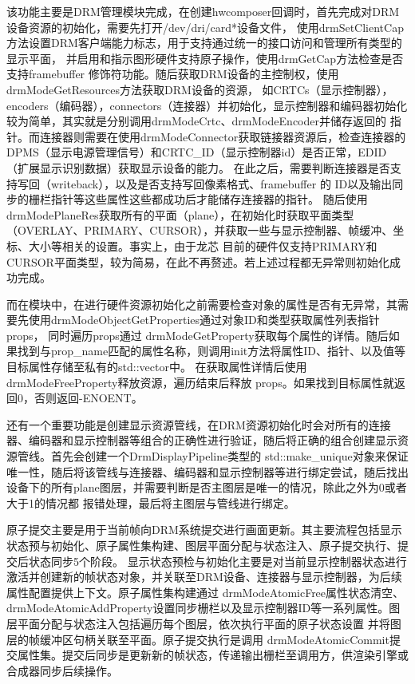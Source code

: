 该功能主要是DRM管理模块完成，在创建hwcomposer回调时，首先完成对DRM设备资源的初始化，需要先打开/dev/dri/card*设备文件，
使用drmSetClientCap方法设置DRM客户端能力标志，用于支持通过统一的接口访问和管理所有类型的显示平面，
并启用和指示图形硬件支持原子操作，使用drmGetCap方法检查是否支持framebuffer 修饰符功能。随后获取DRM设备的主控制权，使用drmModeGetResources方法获取DRM设备的资源，
如CRTCs（显示控制器），encoders（编码器），connectors（连接器）并初始化，显示控制器和编码器初始化较为简单，其实就是分别调用drmModeCrtc、drmModeEncoder并储存返回的
指针。而连接器则需要在使用drmModeConnector获取链接器资源后，检查连接器的DPMS（显示电源管理信号）和CRTC\_ID（显示控制器id）是否正常，EDID（扩展显示识别数据）获取显示设备的能力。
在此之后，需要判断连接器是否支持写回（writeback），以及是否支持写回像素格式、framebuffer 的 ID以及输出同步的栅栏指针等这些属性这些都成功后才能储存连接器的指针。
随后使用drmModePlaneRes获取所有的平面（plane），在初始化时获取平面类型（OVERLAY、PRIMARY、CURSOR），并获取一些与显示控制器、帧缓冲、坐标、大小等相关的设置。事实上，由于龙芯
目前的硬件仅支持PRIMARY和CURSOR平面类型，较为简易，在此不再赘述。若上述过程都无异常则初始化成功完成。

而在模块中，在进行硬件资源初始化之前需要检查对象的属性是否有无异常，其需要先使用drmModeObjectGetProperties通过对象ID和类型获取属性列表指针 props，
同时遍历props通过 drmModeGetProperty获取每个属性的详情。随后如果找到与prop\_name匹配的属性名称，则调用init方法将属性ID、指针、以及值等目标属性存储至私有的std::vector中。
在获取属性详情后使用drmModeFreeProperty释放资源，遍历结束后释放 props。如果找到目标属性就返回0，否则返回-ENOENT。

还有一个重要功能是创建显示资源管线，在DRM资源初始化时会对所有的连接器、编码器和显示控制器等组合的正确性进行验证，随后将正确的组合创建显示资源管线。首先会创建一个DrmDisplayPipeline类型的
std::make\_unique对象来保证唯一性，随后将该管线与连接器、编码器和显示控制器等进行绑定尝试，随后找出设备下的所有plane图层，并需要判断是否主图层是唯一的情况，除此之外为0或者大于1的情况都
报错处理，最后将主图层与管线进行绑定。

原子提交主要是用于当前帧向DRM系统提交进行画面更新。其主要流程包括显示状态预与初始化、原子属性集构建、图层平面分配与状态注入、原子提交执行、提交后状态同步5个阶段。
显示状态预检与初始化主要是对当前显示控制器状态进行激活并创建新的帧状态对象，并关联至DRM设备、连接器与显示控制器，为后续属性配置提供上下文。原子属性集构建通过
drmModeAtomicFree属性状态清空、drmModeAtomicAddProperty设置同步栅栏以及显示控制器ID等一系列属性。图层平面分配与状态注入包括遍历每个图层，依次执行平面的原子状态设置
并将图层的帧缓冲区句柄关联至平面。原子提交执行是调用 drmModeAtomicCommit提交属性集。提交后同步是更新新的帧状态，传递输出栅栏至调用方，供渲染引擎或合成器同步后续操作。

